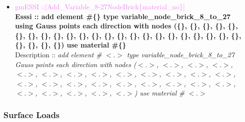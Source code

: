 \documentclass[11pt]{article}
\begin{document}
\begin{itemize}
    \item \textcolor{violet}{gmESSI ::[Add\_Variable\_8-27NodeBrick\{material\_no\}]} \\             
    \textbf{Esssi :: add element \#\{\} type variable\_node\_brick\_8\_to\_27 using  Gauss points each direction with nodes (\{\}, \{\}, \{\}, \{\}, \{\}, \{\}, \{\}, \{\}, \{\}, \{\}, \{\}, \{\}, \{\}, \{\}, \{\}, \{\}, \{\}, \{\}, \{\}, \{\}, \{\}, \{\}, \{\}, \{\}, \{\}, \{\}, \{\}) use material \#\{\}}\\
    Description :: \textit{ add element \# $<.>$ type variable\_node\_brick\_8\_to\_27 Gauss points each direction with nodes ($<.>$, $<.>$, $<.>$, $<.>$, $<.>$, $<.>$, $<.>$, $<.>$, $<.>$, $<.>$, $<.>$, $<.>$, $<.>$, $<.>$, $<.>$, $<.>$, $<.>$, $<.>$, $<.>$, $<.>$, $<.>$, $<.>$, $<.>$, $<.>$, $<.>$, $<.>$, $<.>$) use material \# $<.>$}

  \end{itemize}

  \subsubsection{Surface Loads}
\end{document}
